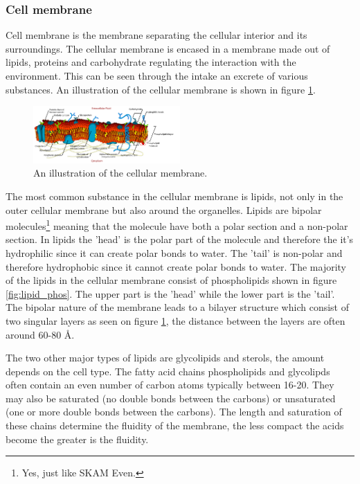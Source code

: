 \documentclass[jmp, amsmath, amssymb, reprint]{article}
\numberwithin{equation}{section}
\begin{document}
\begin{multicols}{2}

\subsubsection{Cell membrane}

Cell membrane is the membrane separating the cellular interior and its surroundings. The cellular membrane is encased in a membrane made out of lipids, proteins and carbohydrate regulating the interaction with the environment. This can be seen through the intake an excrete of various substances. An illustration of the cellular membrane is shown in figure \ref{fig:cell_membrane}.

\begin{figure}[H]
	\centering
  	\includegraphics[width=0.5\textwidth]{cell_membrane.png}%
	\caption{An illustration of the cellular membrane.}
	\label{fig:cell_membrane}
\end{figure}

The most common substance in the cellular membrane is lipids, not only in the outer cellular membrane but also around the organelles. Lipids are bipolar molecules\footnote{Yes, just like SKAM Even.} meaning that the molecule have both a polar section and a non-polar section. In lipids the 'head' is the polar part of the molecule and therefore the it's hydrophilic since it can create polar bonds to water. The 'tail' is non-polar and therefore hydrophobic since it cannot create polar bonds to water. The majority of the lipids in the cellular membrane consist of phospholipids shown in figure \ref{fig:lipid_phos}. The upper part is the 'head' while the lower part is the 'tail'. The bipolar nature of the membrane leads to a bilayer structure which consist of two singular layers as seen on figure \ref{fig:cell_membrane}, the distance between the layers are often around 60-80 Å.

The two other major types of lipids are glycolipids and sterols, the amount depends on the cell type. The fatty acid chains phospholipids and glycolipds often contain an even number of carbon atoms typically between 16-20. They may also be saturated (no double bonds between the carbons) or unsaturated (one or more double bonds between the carbons). The length and saturation of these chains determine the fluidity of the membrane, the less compact the acids become the greater is the fluidity.


\end{multicols}
\end{document}
